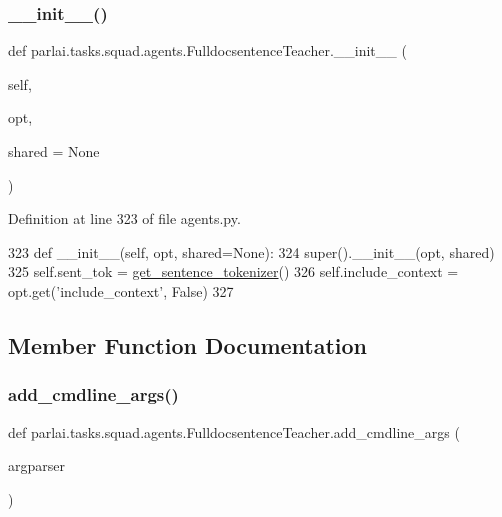 \subsubsection{\texorpdfstring{\+\_\+\+\_\+init\+\_\+\+\_\+()}{\_\_init\_\_()}}
{\footnotesize\ttfamily def parlai.\+tasks.\+squad.\+agents.\+Fulldocsentence\+Teacher.\+\_\+\+\_\+init\+\_\+\+\_\+ (\begin{DoxyParamCaption}\item[{}]{self,  }\item[{}]{opt,  }\item[{}]{shared = {\ttfamily None} }\end{DoxyParamCaption})}



Definition at line 323 of file agents.\+py.


\begin{DoxyCode}
323     \textcolor{keyword}{def }\_\_init\_\_(self, opt, shared=None):
324         super().\_\_init\_\_(opt, shared)
325         self.sent\_tok = \hyperlink{namespaceparlai_1_1tasks_1_1squad_1_1agents_aedb3f218a9f6d84f322f3b17372bd047}{get\_sentence\_tokenizer}()
326         self.include\_context = opt.get(\textcolor{stringliteral}{'include\_context'}, \textcolor{keyword}{False})
327 
\end{DoxyCode}


\subsection{Member Function Documentation}
\mbox{\label{classparlai_1_1tasks_1_1squad_1_1agents_1_1FulldocsentenceTeacher_af4fae24533376a66d54c771b6c8d06b7}} 
\subsubsection{\texorpdfstring{add\+\_\+cmdline\+\_\+args()}{add\_cmdline\_args()}}
{\footnotesize\ttfamily def parlai.\+tasks.\+squad.\+agents.\+Fulldocsentence\+Teacher.\+add\+\_\+cmdline\+\_\+args (\begin{DoxyParamCaption}\item[{}]{argparser }\end{DoxyParamCaption})\hspace{0.3cm}{\ttfamily [static]}}



